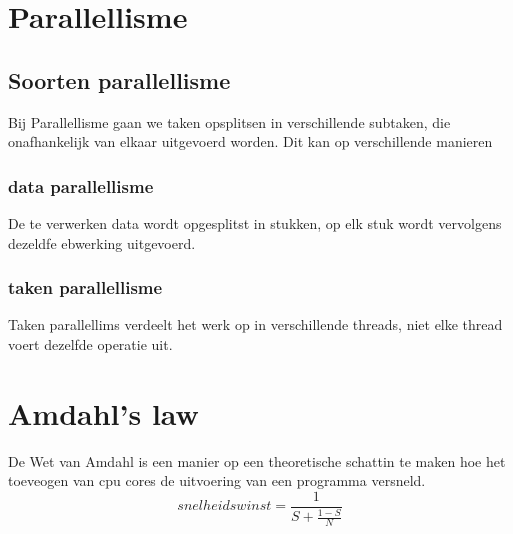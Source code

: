 \documentclass{report}
\begin{document}
   		\section{Parallellisme}
   			\subsection{Soorten parallellisme}
   				Bij Parallellisme gaan we taken opsplitsen in verschillende subtaken, die onafhankelijk van elkaar uitgevoerd worden. Dit kan op verschillende manieren
   				\subsubsection{data parallellisme}
   					De te verwerken data wordt opgesplitst in stukken, op elk stuk wordt vervolgens dezeldfe ebwerking uitgevoerd. 
   				\subsubsection{taken parallellisme}
   					Taken parallellims verdeelt het werk op in verschillende threads, niet elke thread voert dezelfde operatie uit. 
   		\section{Amdahl's law}
   			De Wet van Amdahl is een manier op een theoretische schattin te maken hoe het toeveogen van cpu cores de uitvoering van een programma versneld. 
   			\[snelheidswinst = \frac{1}{S + \frac{1 - S}{N}}\]
   			
\end{document}
